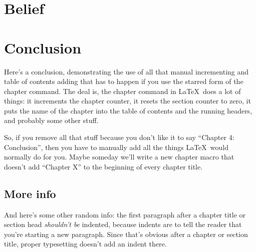 \documentclass[12pt,twoside]{reedfancy}
\begin{document}
\begin{spacing}{1.25}

\chapter{Belief}


	


\chapter{Conclusion}
\label{concl}
	
Here's a conclusion, demonstrating the use of all that manual
incrementing and table of contents adding that has to happen if you
use the starred form of the chapter command.  The deal is, the chapter
command in \LaTeX\ does a lot of things: it increments the chapter
counter, it resets the section counter to zero, it puts the name of
the chapter into the table of contents and the running headers, and
probably some other stuff.

So, if you remove all that stuff because you don't like it to say
``Chapter 4: Conclusion'', then you have to manually add all the
things \LaTeX\ would normally do for you.  Maybe someday we'll write a
new chapter macro that doesn't add ``Chapter X'' to the beginning of
every chapter title.

\section{More info}
And here's some other random info: the first paragraph after a chapter
title or section head \emph{shouldn't be} indented, because indents
are to tell the reader that you're starting a new paragraph.  Since
that's obvious after a chapter or section title, proper typesetting
doesn't add an indent there.



\end{spacing}
\end{document}
